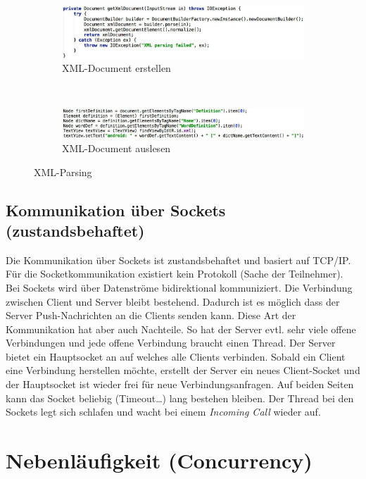 \begin{figure}
	\centering
	\begin{subfigure}[b]{0.48\textwidth}
		\includegraphics[width=\textwidth]{fig/xml-document-erstellen}
		\caption{XML-Document erstellen}
	\end{subfigure}
	~
	\begin{subfigure}[b]{0.48\textwidth}
		\includegraphics[width=\textwidth]{fig/xml-document-auslesen}
		\caption{XML-Document auslesen}
	\end{subfigure}
	\caption{XML-Parsing}
	\label{fig:xml}
\end{figure}

\subsection{Kommunikation über Sockets (zustandsbehaftet)}

Die Kommunikation über Sockets ist zustandsbehaftet und basiert auf TCP/IP. Für die Socketkommunikation existiert kein Protokoll (Sache der Teilnehmer). Bei Sockets wird über Datenströme bidirektional kommuniziert. Die Verbindung zwischen Client und Server bleibt bestehend. Dadurch ist es möglich dass der Server Push-Nachrichten an die Clients senden kann. Diese Art der Kommunikation hat aber auch Nachteile. So hat der Server evtl. sehr viele offene Verbindungen und jede offene Verbindung braucht einen Thread.
Der Server bietet ein Hauptsocket an auf welches alle Clients verbinden. Sobald ein Client eine Verbindung herstellen möchte, erstellt der Server ein neues Client-Socket und der Hauptsocket ist wieder frei für neue Verbindungsanfragen. Auf beiden Seiten kann das Socket beliebig (Timeout\dots) lang bestehen bleiben. Der Thread bei den Sockets legt sich schlafen und wacht bei einem \emph{Incoming Call} wieder auf.

\section{Nebenläufigkeit (Concurrency)}

